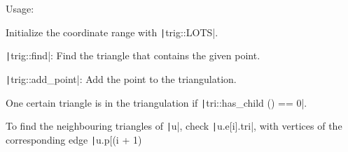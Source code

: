 Usage:
\begin{compactenum}
\item Initialize the coordinate range with \texttt|trig::LOTS|.
\item \texttt|trig::find|: Find the triangle that contains the given point.
\item \texttt|trig::add_point|: Add the point to the triangulation.
\item One certain triangle is in the triangulation if \texttt|tri::has_child () == 0|.
\item To find the neighbouring triangles of \texttt|u|, check \texttt|u.e[i].tri|, with vertices of the corresponding edge \texttt|u.p[(i + 1) %
\end{compactenum}
\inputminted{cpp}{src/geometry/2d-geometry/delaunay-triangulation.cpp.com}
